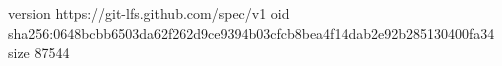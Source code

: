 version https://git-lfs.github.com/spec/v1
oid sha256:0648bcbb6503da62f262d9ce9394b03cfcb8bea4f14dab2e92b285130400fa34
size 87544
